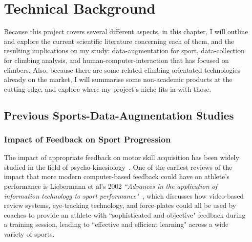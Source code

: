 \chapter{Technical Background}
\label{chap:technical}





\noindent
Because this project covers several different aspects, in this chapter, I will outline and explore the current scientific literature concerning each of them, and the resulting implications on my study: data-augmentation for sport, data-collection for climbing analysis, and human-computer-interaction that has focused on climbers.
Also, because there are some related climbing-orientated technologies already on the market, I will summarise some non-academic products at the cutting-edge, and explore where my project's niche fits in with those.


\section{Previous Sports-Data-Augmentation Studies}
\subsection{Impact of Feedback on Sport Progression}
The impact of appropriate feedback on motor skill acquisition has been widely studied in the field of psycho-kinesiology~\cite{schmidt75aschema, schmidt2005motor}.
One of the earliest reviews of the impact that more modern computer-based feedback could have on athlete's performance is Liebermann et al's 2002 \textit{``Advances in the application of information technology
to sport performance"}~\cite{lieberreview}, which discusses how video-based review systems, eye-tracking technology, and force-plates could all be used by coaches to provide an athlete with ``sophisticated and objective" feedback during a training session, leading to ``effective and efficient learning" across a wide variety of sports.

